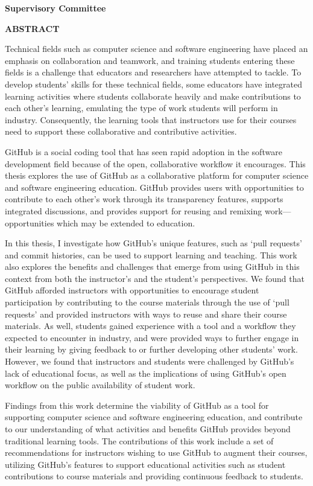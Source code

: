 \newpage
{}

\noindent \textbf{Supervisory Committee}
\tpbreak
\panel

\begin{center}
\textbf{ABSTRACT}
\end{center}

Technical fields such as computer science and software engineering have placed an emphasis on collaboration and teamwork, and training students entering these fields is a challenge that educators and researchers have attempted to tackle. To develop students' skills for these technical fields, some educators have integrated learning activities where students collaborate heavily and make contributions to each other's learning, emulating the type of work students will perform in industry. Consequently, the learning tools that instructors use for their courses need to support these collaborative and contributive activities.

GitHub is a social coding tool that has seen rapid adoption in the software development field because of the open, collaborative workflow it encourages. This thesis explores the use of GitHub as a collaborative platform for computer science and software engineering education. GitHub provides users with opportunities to contribute to each other's work through its transparency features, supports integrated discussions, and provides support for reusing and remixing work---opportunities which may be extended to education.

In this thesis, I investigate how GitHub's unique features, such as `pull requests' and commit histories, can be used to support learning and teaching. This work also explores the benefits and challenges that emerge from using GitHub in this context from both the instructor's and the student's perspectives. We found that GitHub afforded instructors with opportunities to encourage student participation by contributing to the course materials through the use of `pull requests' and provided instructors with ways to reuse and share their course materials. As well, students gained experience with a tool and a workflow they expected to encounter in industry, and were provided ways to further engage in their learning by giving feedback to or further developing other students' work. However, we found that instructors and students were challenged by GitHub's lack of educational focus, as well as the implications of using GitHub's open workflow on the public availability of student work.

Findings from this work determine the viability of GitHub as a tool for supporting computer science and software engineering education, and contribute to our understanding of what activities and benefits GitHub provides beyond traditional learning tools. The contributions of this work include a set of recommendations for instructors wishing to use GitHub to augment their courses, utilizing GitHub's features to support educational activities such as student contributions to course materials and providing continuous feedback to students.
